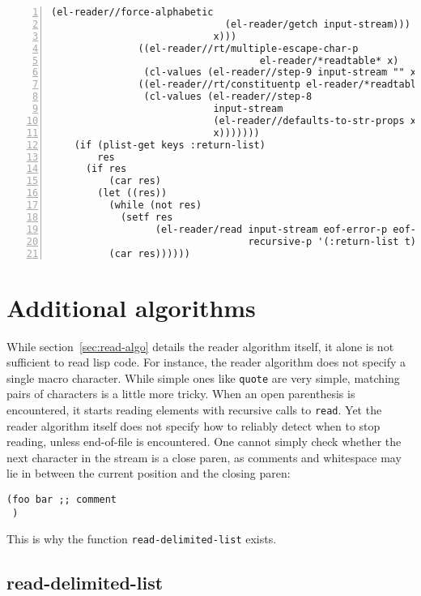 \documentclass[a4paper,10pt,twoside]{report}
\newcommand{\fun}[1]{\texttt{#1}}
\newcommand{\Read}{\fun{read}}
\begin{document}
\begin{lstlisting}[style=lispcode,label={code:read-algo},caption={Code for the
    reader algorithm.},numbers=left]
                             (el-reader//force-alphabetic
                              (el-reader/getch input-stream)))
                            x)))
               ((el-reader//rt/multiple-escape-char-p
                                    el-reader/*readtable* x)
                (cl-values (el-reader//step-9 input-stream "" x)))
               ((el-reader//rt/constituentp el-reader/*readtable* x)
                (cl-values (el-reader//step-8
                            input-stream
                            (el-reader//defaults-to-str-props x)
                            x)))))))
    (if (plist-get keys :return-list)
        res
      (if res
          (car res)
        (let ((res))
          (while (not res)
            (setf res
                  (el-reader/read input-stream eof-error-p eof-value
                                  recursive-p '(:return-list t))))
          (car res))))))
\end{lstlisting}


\section{Additional algorithms}
\label{sec:add-algos}

While section~\ref{sec:read-algo} details the reader algorithm itself, it alone
is not sufficient to read lisp code.  For instance, the reader algorithm does
not specify a single macro character.  While simple ones like \fun{quote} are
very simple, matching pairs of characters is a little more tricky.  When an open
parenthesis is encountered, it starts reading elements with recursive calls to
\Read{}.  Yet the reader algorithm itself does not specify how to reliably
detect when to stop reading, unless end-of-file is encountered.  One cannot
simply check whether the next character in the stream is a close paren, as
comments and whitespace may lie in between the current position and the closing
paren:

\begin{lstlisting}[style=lispinline]
(foo bar ;; comment
 )
\end{lstlisting}

This is why the function \fun{read-delimited-list} exists.

\subsection{read-delimited-list}
\label{subsec:read-delimited-list}
\end{document}
